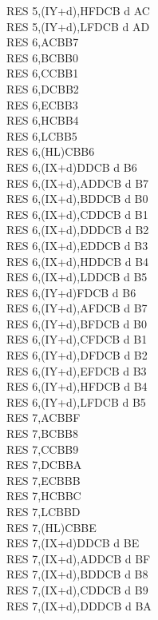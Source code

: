\begin{multicols}{3}
{\begin{tabbing}
		RES 5,(IY+d),H\UNDOC\>FDCB d AC\\
		RES 5,(IY+d),L\UNDOC\>FDCB d AD\\
		RES 6,A\>CBB7\\
		RES 6,B\>CBB0\\
		RES 6,C\>CBB1\\
		RES 6,D\>CBB2\\
		RES 6,E\>CBB3\\
		RES 6,H\>CBB4\\
		RES 6,L\>CBB5\\
		RES 6,(HL)\>CBB6\\
		RES 6,(IX+d)\>DDCB d B6\\
		RES 6,(IX+d),A\UNDOC\>DDCB d B7\\
		RES 6,(IX+d),B\UNDOC\>DDCB d B0\\
		RES 6,(IX+d),C\UNDOC\>DDCB d B1\\
		RES 6,(IX+d),D\UNDOC\>DDCB d B2\\
		RES 6,(IX+d),E\UNDOC\>DDCB d B3\\
		RES 6,(IX+d),H\UNDOC\>DDCB d B4\\
		RES 6,(IX+d),L\UNDOC\>DDCB d B5\\
		RES 6,(IY+d)\>FDCB d B6\\
		RES 6,(IY+d),A\UNDOC\>FDCB d B7\\
		RES 6,(IY+d),B\UNDOC\>FDCB d B0\\
		RES 6,(IY+d),C\UNDOC\>FDCB d B1\\
		RES 6,(IY+d),D\UNDOC\>FDCB d B2\\
		RES 6,(IY+d),E\UNDOC\>FDCB d B3\\
		RES 6,(IY+d),H\UNDOC\>FDCB d B4\\
		RES 6,(IY+d),L\UNDOC\>FDCB d B5\\
		RES 7,A\>CBBF\\
		RES 7,B\>CBB8\\
		RES 7,C\>CBB9\\
		RES 7,D\>CBBA\\
		RES 7,E\>CBBB\\
		RES 7,H\>CBBC\\
		RES 7,L\>CBBD\\
		RES 7,(HL)\>CBBE\\
		RES 7,(IX+d)\>DDCB d BE\\
		RES 7,(IX+d),A\UNDOC\>DDCB d BF\\
		RES 7,(IX+d),B\UNDOC\>DDCB d B8\\
		RES 7,(IX+d),C\UNDOC\>DDCB d B9\\
		RES 7,(IX+d),D\UNDOC\>DDCB d BA\\

\end{tabbing}}
\end{multicols}
